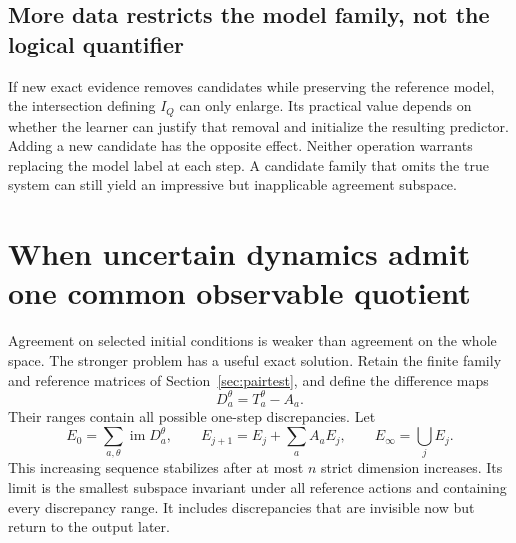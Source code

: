 \documentclass[11pt,letterpaper]{article}
\theoremstyle{plain}
\theoremstyle{definition}
\newcommand{\im}{\operatorname{im}}\newcommand{\supp}{\operatorname{supp}}
\begin{document}
\subsection{More data restricts the model family, not the logical quantifier}
If new exact evidence removes candidates while preserving the reference model, the intersection defining $I_Q$ can only enlarge. Its practical value depends on whether the learner can justify that removal and initialize the resulting predictor. Adding a new candidate has the opposite effect. Neither operation warrants replacing the model label at each step. A candidate family that omits the true system can still yield an impressive but inapplicable agreement subspace.

\section{When uncertain dynamics admit one common observable quotient}\label{sec:commonquotient}
Agreement on selected initial conditions is weaker than agreement on the whole space. The stronger problem has a useful exact solution. Retain the finite family and reference matrices of Section~\ref{sec:pairtest}, and define the difference maps
\[
D_a^\theta=T_a^\theta-A_a.
\]
Their ranges contain all possible one-step discrepancies. Let
\[
E_0=\sum_{a,\theta}\im D_a^\theta,\qquad
E_{j+1}=E_j+\sum_a A_aE_j,\qquad E_\infty=\bigcup_jE_j.
\]
This increasing sequence stabilizes after at most $n$ strict dimension increases. Its limit is the smallest subspace invariant under all reference actions and containing every discrepancy range. It includes discrepancies that are invisible now but return to the output later.
\end{document}
